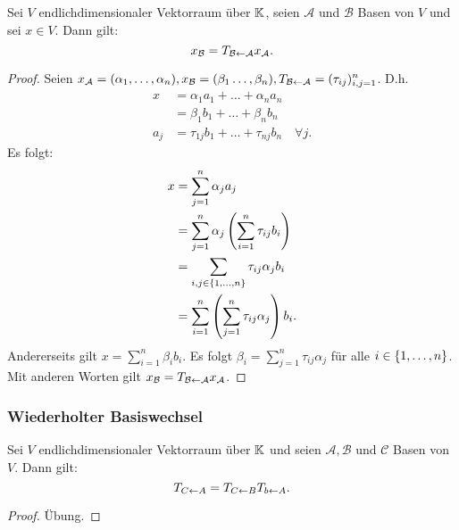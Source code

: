 \begin{thm}
	Sei $ V $ endlichdimensionaler Vektorraum über $ \mathbb K $, seien $ \mathcal{A} $ und $ \mathcal{B} $ Basen von $ V $ und sei $ x \in V $. Dann gilt:
	\begin{equation}
		x_\mathcal{B} = T_{\mathcal{B} \leftarrow \mathcal{A}} x_\mathcal{A}.
	\end{equation}
\end{thm}
\begin{proof}
	Seien $ \begin{aligned}[t] x_\mathcal{A} = (\alpha_1, \ldots, \alpha_n), x_\mathcal{B} = (\beta_1 \ldots, \beta_n), T_{\mathcal{B} \leftarrow \mathcal{A}} = (\tau_{ij})_{i,j=1}^n \end{aligned} $. D.h.
	\begin{align*}
		x &= \alpha_1a_1 + \ldots + \alpha_na_n \\
		&= \beta_1b_1 + \ldots + \beta_nb_n \\
		a_j &= \tau_{1j}b_1 + \ldots + \tau_{nj}b_n \quad \forall j.
	\end{align*}
	Es folgt:
	\begin{align*}
		x &= \sum\limits_{j=1}^n \alpha_ja_j \\
		&= \sum\limits_{j=1}^{n} \alpha_j \left( \sum\limits_{i=1}^{n} \tau_{ij}b_i \right) \\
		&= \sum\limits_{i,j \in \{ 1,\ldots,n \}} \tau_{ij}\alpha_jb_i \\
		&= \sum\limits_{i=1}^{n} \left( \sum\limits_{j=1}^{n} \tau_{ij}\alpha_j \right) b_i.
	\end{align*}
	Andererseits gilt $ x = \sum_{i=1}^n \beta_ib_i $. Es folgt $ \beta_i = \sum_{j=1}^n \tau_{ij}\alpha_j $ für alle $ i \in \{ 1,\ldots,n \} $. Mit anderen Worten gilt $ x_\mathcal{B} = T_{\mathcal{B} \leftarrow \mathcal{A}} x_\mathcal{A} $.
\end{proof}

\subsubsection{Wiederholter Basiswechsel}

\begin{thm}
	Sei $ V $ endlichdimensionaler Vektorraum über $ \mathbb K $ und seien $ \mathcal{A}, \mathcal{B} $ und $ \mathcal{C} $ Basen von $ V $. Dann gilt:
	\begin{equation}
		T_{C \leftarrow A} = T_{C \leftarrow B} T_{b \leftarrow A}.
	\end{equation}
\end{thm}
\begin{proof}
	Übung.
\end{proof}

